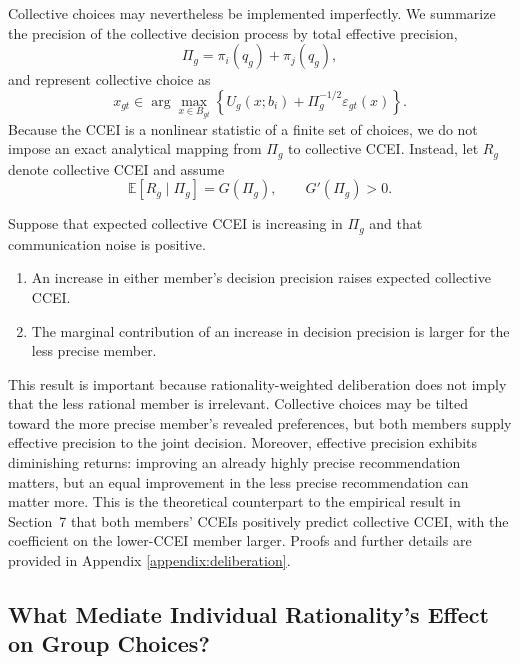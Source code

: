 \documentclass[11 pt]{article}
\begin{document}
Collective choices may nevertheless be implemented imperfectly. We summarize the precision of the collective decision process by total effective precision,
\begin{equation}
    \Pi_g=\pi_i(q_g)+\pi_j(q_g),
    \label{eq:collective_precision_appendix}
\end{equation}
and represent collective choice as
\begin{equation}
    x_{gt}\in\arg\max_{x\in B_{gt}}\left\{U_g(x;b_i)+\Pi_g^{-1/2}\varepsilon_{gt}(x)\right\}.
    \label{eq:collective_random_utility}
\end{equation}
Because the CCEI is a nonlinear statistic of a finite set of choices, we do not impose an exact analytical mapping from $\Pi_g$ to collective CCEI. Instead, let $R_g$ denote collective CCEI and assume
\begin{equation}
    \mathbb{E}[R_g\mid\Pi_g]=G(\Pi_g), \qquad G'(\Pi_g)>0.
    \label{eq:collective_ccei_mapping}
\end{equation}

\begin{proposition}
\label{prop:collective_precision}
Suppose that expected collective CCEI is increasing in $\Pi_g$ and that communication noise is positive.
\begin{enumerate}
    \item An increase in either member's decision precision raises expected collective CCEI.
    \item The marginal contribution of an increase in decision precision is larger for the less precise member.
\end{enumerate}
\end{proposition}

This result is important because rationality-weighted deliberation does not imply that the less rational member is irrelevant. Collective choices may be tilted toward the more precise member's revealed preferences, but both members supply effective precision to the joint decision. Moreover, effective precision exhibits diminishing returns: improving an already highly precise recommendation matters, but an equal improvement in the less precise recommendation can matter more. This is the theoretical counterpart to the empirical result in Section~7 that both members' CCEIs positively predict collective CCEI, with the coefficient on the lower-CCEI member larger. Proofs and further details are provided in Appendix \autoref{appendix:deliberation}.


\subsection{What Mediate Individual Rationality's Effect on Group Choices?}
\label{sec:heterogeneity}
\end{document}
